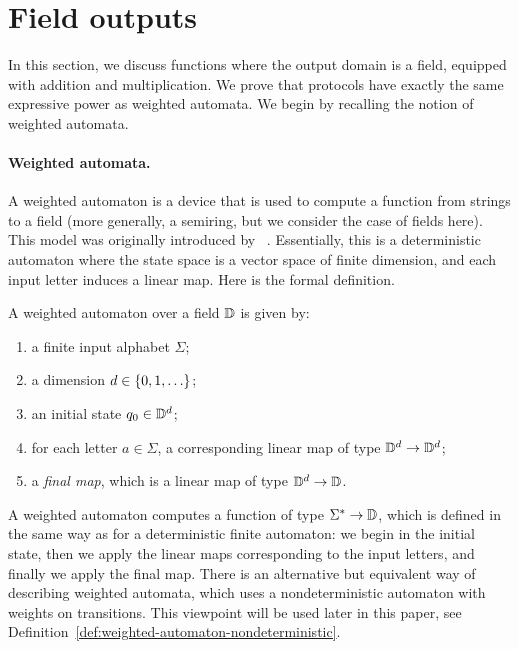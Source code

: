 \section{Field outputs}
\label{sec:field-domain}
In this section, we discuss functions where the output domain is a field, equipped with addition and multiplication. We prove that protocols have  exactly the same expressive power as weighted automata.
We begin by recalling the notion of weighted automata.

\paragraph*{Weighted automata.}  A weighted automaton is a device that is used to compute a function from strings to a field (more generally, a semiring, but we consider the case of fields here). This model was originally introduced by \schutz~\cite{schutzenberger1961definition}. Essentially, this is a deterministic automaton where the state space is a vector space of finite dimension, and each input letter induces a linear map. Here is the formal definition. 

\begin{definition}
    \label{def:weighted-automaton}
    A weighted automaton over a field $\mathbb D$ is given by: 
    \begin{enumerate}
        \item a finite input alphabet $\Sigma$;
        \item a dimension $d \in \{0,1,\ldots\}$;
        \item an initial state $q_0 \in \mathbb D^d$;
        \item \label{it:weighted-definition-transitions} for each letter $a \in \Sigma$, a corresponding linear map of type $\mathbb D^d \to \mathbb D^d$;
        \item \label{it:weighted-definition-final} a \emph{final map}, which is a linear map of type $\mathbb D^d \to \mathbb D$. 
    \end{enumerate}
\end{definition}

A weighted automaton computes a function of type $\Sigma^* \to \mathbb D$, which is defined in the same way as for a deterministic finite automaton: we begin in the initial state, then we apply the linear maps corresponding to the input letters, and finally we apply the final map. There is an alternative but equivalent way of describing weighted automata, which uses a nondeterministic automaton with weights on transitions. This viewpoint will be used later in this paper, see Definition~\ref{def:weighted-automaton-nondeterministic}.

